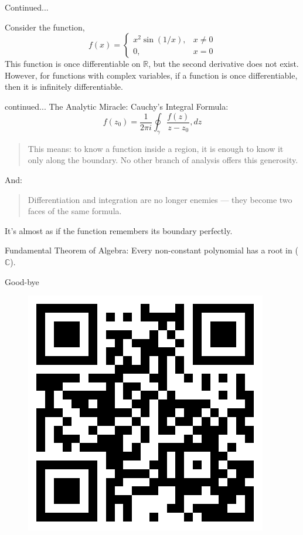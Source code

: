 \documentclass[11pt]{beamer}
\theoremstyle{plain}
\begin{document}
\begin{frame}{Continued...}
    \begin{tcolorbox}
        Consider the function, $$f(x)=\begin{cases}
            x^2\sin(1/x),&x\neq 0\\
            0, &x=0
        \end{cases}$$
        This function is once differentiable on $\mathbb R$, but the second derivative does not exist. However, for functions with complex variables, if a function is once differentiable, then it is infinitely differentiable.
    \end{tcolorbox}
\end{frame}

\begin{frame}{continued...}
The Analytic Miracle: Cauchy’s Integral Formula:
$$
f(z_0) = \frac{1}{2\pi i} \oint_{\gamma} \frac{f(z)}{z - z_0},dz
$$
\begin{quote}
    This means: to know a function inside a region, it is enough to know it only along the boundary. No other branch of analysis offers this generosity.    
\end{quote}
And:
\begin{quote}
   Differentiation and integration are no longer enemies — they become two faces of the same formula. 
\end{quote}
It’s almost as if the function remembers its boundary perfectly.
\begin{tcolorbox}
    Fundamental Theorem of Algebra: Every non-constant polynomial has a root in ($\mathbb{C}$).
\end{tcolorbox}
\end{frame}

\begin{frame}{Good-bye}
    \begin{figure}
        \centering
        \includegraphics[width=0.5\linewidth]{qrcode.png}
    \end{figure}
\end{frame}
\end{document}

